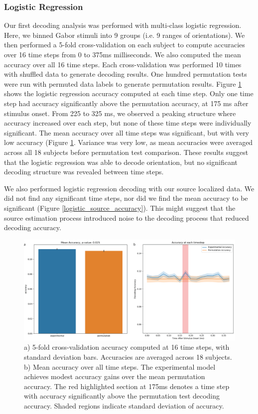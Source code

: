 \documentclass[../main.tex]{subfiles}
\begin{document}
\subsubsection*{Logistic Regression}
Our first decoding analysis was performed with multi-class logistic regression. Here, we binned Gabor stimuli into 9 groups (i.e. 9 ranges of orientations). We then performed a 5-fold cross-validation on each subject to compute accuracies over 16 time steps from 0 to 375ms milliseconds. We also computed the mean accuracy over all 16 time steps. Each cross-validation was performed 10 times with shuffled data to generate decoding results. One hundred permutation tests were run with permuted data labels to generate permutation results. Figure \ref{logistic_sensor_accuracy} shows the logistic regression accuracy computed at each time step. Only one time step had accuracy significantly above the permutation accuracy, at 175 ms after stimulus onset. From 225 to 325 ms, we observed a peaking structure where accuracy increased over each step, but none of these time steps were individually significant. The mean accuracy over all time steps was significant, but with very low accuracy (Figure \ref{logistic_sensor_accuracy}. Variance was very low, as mean accuracies were averaged across all 18 subjects before permutation test comparison. These results suggest that the logistic regression was able to decode orientation, but no significant decoding structure was revealed between time steps. 

We also performed logistic regression decoding with our source localized data. We did not find any significant time steps, nor did we find the mean accuracy to be significant (Figure \ref{logistic_source_accuracy}). This might suggest that the source estimation process introduced noise to the decoding process that reduced decoding accuracy.


\begin{figure}
    \centering
    \includegraphics[scale=0.7]{figures/results/logistic_sensor_accuracy.png}
    \caption{a) 5-fold cross-validation accuracy computed at 16 time steps, with standard deviation bars. Accuracies are averaged across 18 subjects. b) Mean accuracy over all time steps. The experimental model achieves modest accuracy gains over the mean permutation accuracy. The red highlighted section at 175ms denotes a time step with accuracy significantly above the permutation test decoding accuracy. Shaded regions indicate standard deviation of accuracy.}
    \label{logistic_sensor_accuracy}
\end{figure}
\end{document}
